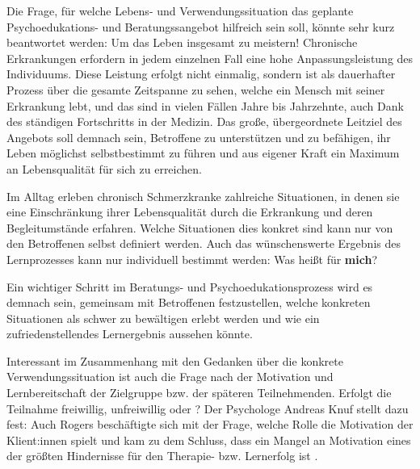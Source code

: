 \documentclass[
  twoside,
  parskip=half-,
]{scrreprt}
\begin{document}
\begin{praxis}
  Die Frage, für welche Lebens- und Verwendungssituation das geplante Psychoedukations- und Beratungssangebot hilfreich sein soll, könnte sehr kurz beantwortet werden: Um das Leben insgesamt zu  meistern! Chronische Erkrankungen erfordern in jedem einzelnen Fall eine hohe Anpassungsleistung des Individuums. Diese Leistung erfolgt nicht einmalig, sondern ist als dauerhafter Prozess über die gesamte Zeitspanne zu sehen, welche ein Mensch mit seiner Erkrankung lebt, und das sind in vielen Fällen Jahre bis Jahrzehnte, auch Dank des ständigen Fortschritts in der Medizin. Das große, übergeordnete Leitziel des Angebots soll demnach sein, Betroffene zu unterstützen und zu befähigen, ihr Leben möglichst selbstbestimmt zu führen und aus eigener Kraft ein Maximum an Lebensqualität für sich zu erreichen. 

  Im Alltag erleben chronisch Schmerzkranke zahlreiche Situationen, in denen sie eine Einschränkung ihrer Lebensqualität durch die Erkrankung und deren Begleitumstände erfahren. Welche Situationen dies konkret sind kann nur von den Betroffenen selbst definiert werden. Auch das wünschenswerte Ergebnis des Lernprozesses kann nur individuell bestimmt werden: Was heißt  für \textbf{mich}? 

  Ein wichtiger Schritt im Beratungs- und Psychoedukationsprozess wird es demnach sein, gemeinsam mit Betroffenen festzustellen, welche konkreten Situationen als schwer zu bewältigen erlebt werden und wie ein zufriedenstellendes Lernergebnis aussehen könnte.
\end{praxis}

Interessant im Zusammenhang mit den Gedanken über die konkrete Verwendungssituation ist auch die Frage nach der Motivation und Lernbereitschaft der Zielgruppe bzw. der späteren Teilnehmenden. Erfolgt die Teilnahme freiwillig, unfreiwillig oder ? Der Psychologe Andreas Knuf stellt dazu fest:  Auch Rogers beschäftigte sich mit der Frage, welche Rolle die Motivation der Klient:innen spielt und kam zu dem Schluss, dass ein Mangel an Motivation eines der größten Hindernisse für den Therapie- bzw. Lernerfolg ist \autocite[vgl.][196]{rogers1977}.
\end{document}

